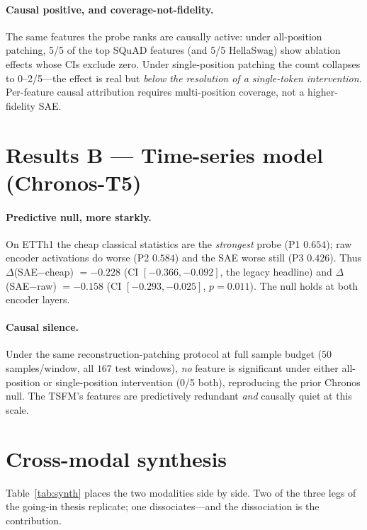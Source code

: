 \documentclass[11pt]{article}
\newcommand{\sae}{SAE}
\begin{document}
\paragraph{Causal positive, and coverage-not-fidelity.}
The same features the probe ranks are causally active: under all-position
patching, 5/5 of the top SQuAD features (and 5/5 HellaSwag) show ablation effects
whose CIs exclude zero. Under single-position patching the count collapses to
0--2/5---the effect is real but \emph{below the resolution of a single-token
intervention}. Per-feature causal attribution requires multi-position coverage,
not a higher-fidelity \sae{}.

\section{Results B --- Time-series model (Chronos-T5)}
\label{sec:tsfm}

\paragraph{Predictive null, more starkly.}
On ETTh1 the cheap classical statistics are the \emph{strongest} probe
(P1 $0.654$); raw encoder activations do worse (P2 $0.584$) and the \sae{} worse
still (P3 $0.426$). Thus $\Delta$(\sae{}$-$cheap) $=-0.228$ (CI $[-0.366,-0.092]$,
the legacy headline) and $\Delta$(\sae{}$-$raw) $=-0.158$ (CI $[-0.293,-0.025]$,
$p=0.011$). The null holds at both encoder layers.

\paragraph{Causal silence.}
Under the same reconstruction-patching protocol at full sample budget
($50$ samples/window, all $167$ test windows), \emph{no} feature is significant
under either all-position or single-position intervention (0/5 both),
reproducing the prior Chronos null. The TSFM's features are predictively
redundant \emph{and} causally quiet at this scale.

\section{Cross-modal synthesis}
\label{sec:synth}

Table~\ref{tab:synth} places the two modalities side by side. Two of the three
legs of the going-in thesis replicate; one dissociates---and the dissociation is
the contribution.
\end{document}
